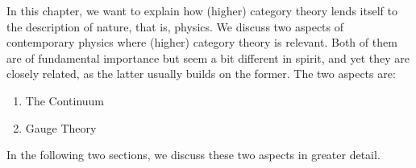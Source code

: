 In this chapter, we want to explain how (higher) category theory lends itself to the description of nature, that is, physics.
We discuss two aspects of contemporary physics where (higher) category theory is relevant.
Both of them are of fundamental importance but seem a bit different in spirit, and yet they are closely related, as the latter usually builds on the former.
The two aspects are:
\begin{enumerate}
\item[$\bullet$]
The Continuum
\item[$\bullet$]
Gauge Theory
\end{enumerate}
In the following two sections, we discuss these two aspects in greater detail.
